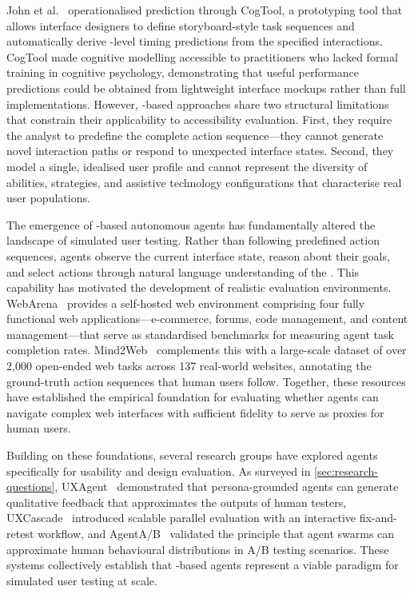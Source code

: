 John et al.~\cite{cogtool} operationalised  prediction through CogTool, a prototyping tool that allows interface designers to define storyboard-style task sequences and automatically derive -level timing predictions from the specified interactions. CogTool made cognitive modelling accessible to practitioners who lacked formal training in cognitive psychology, demonstrating that useful performance predictions could be obtained from lightweight interface mockups rather than full implementations. However, -based approaches share two structural limitations that constrain their applicability to accessibility evaluation. First, they require the analyst to predefine the complete action sequence---they cannot generate novel interaction paths or respond to unexpected interface states. Second, they model a single, idealised user profile and cannot represent the diversity of abilities, strategies, and assistive technology configurations that characterise real user populations.

The emergence of -based autonomous agents has fundamentally altered the landscape of simulated user testing. Rather than following predefined action sequences,  agents observe the current interface state, reason about their goals, and select actions through natural language understanding of the . This capability has motivated the development of realistic evaluation environments. WebArena~\cite{zhou2024webarena} provides a self-hosted web environment comprising four fully functional web applications---e-commerce, forums, code management, and content management---that serve as standardised benchmarks for measuring agent task completion rates. Mind2Web~\cite{deng2023mind2web} complements this with a large-scale dataset of over 2,000 open-ended web tasks across 137 real-world websites, annotating the ground-truth action sequences that human users follow. Together, these resources have established the empirical foundation for evaluating whether  agents can navigate complex web interfaces with sufficient fidelity to serve as proxies for human users.

Building on these foundations, several research groups have explored  agents specifically for usability and design evaluation. As surveyed in \cref{sec:research-questions}, UXAgent~\cite{uxagent} demonstrated that persona-grounded agents can generate qualitative feedback that approximates the outputs of human testers, UXCascade~\cite{uxcascade} introduced scalable parallel evaluation with an interactive fix-and-retest workflow, and AgentA/B~\cite{agentab} validated the principle that agent swarms can approximate human behavioural distributions in A/B testing scenarios. These systems collectively establish that -based agents represent a viable paradigm for simulated user testing at scale.

